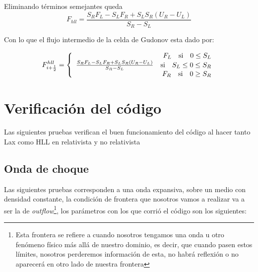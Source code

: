 \documentclass[12pt,a4paper]{book}
\begin{document}
Eliminando términos semejantes queda
\begin{equation}
F_{hll} = \frac{S_R F_L -S_L F_R + S_L S_R \left(U_R-U_L \right)}{S_R -S_L}
\end{equation}

Con lo que el flujo intermedio de la celda de Gudonov esta dado por:

\begin{equation}
F_{i+\frac{1}{2}}^{hll} = 
\left\lbrace
\begin{array}{rr}
F_L \quad \textup{si} \quad 0 \leq S_L  \\
\frac{S_R F_L -S_L F_R + S_L S_R \left(U_R-U_L \right)}{S_R -S_L} \quad \textup{si} \quad S_L \leq 0 \leq S_R \\
F_R \quad \textup{si} \quad  0 \geq  S_R
\end{array}
\right.
\end{equation}




\chapter{Verificación del código}

Las siguientes pruebas verifican el buen funcionamiento del código al hacer tanto Lax como HLL en relativista y no relativista

\section{Onda de choque}
Las siguientes pruebas corresponden a una onda expansiva, sobre un medio con densidad constante, la condición de frontera que nosotros vamos a realizar va a ser la de \emph{outflow}\footnote{Esta frontera se refiere a cuando nosotros tengamos una onda u otro fenómeno físico más allá de nuestro dominio, es decir, que cuando pasen estos límites, nosotros perderemos información de esta, no habrá reflexión o no aparecerá en otro lado de nuestra frontera}, los parámetros con los que corrió el código son los siguientes:
\end{document}
